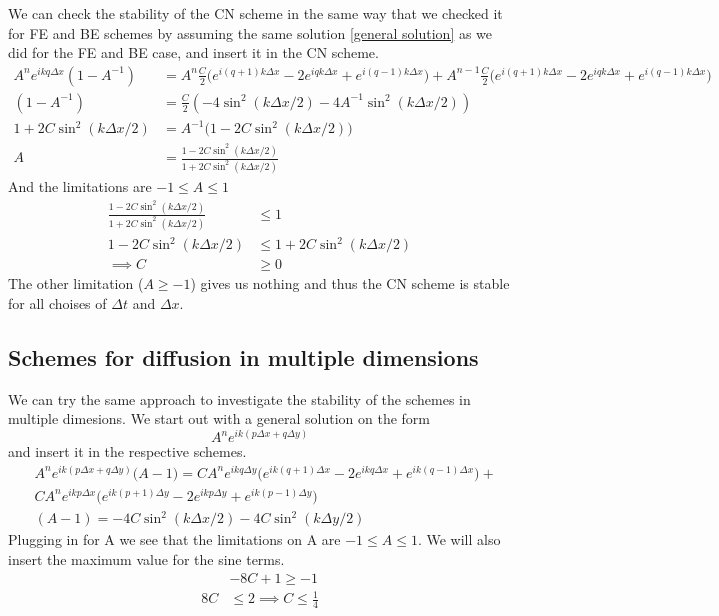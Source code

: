 \documentclass[a4paper,english, 10pt, twoside]{article}
\begin{document}
We can check the stability of the CN scheme in the same way that we checked it for FE and BE schemes by assuming the same solution 
\ref{general solution} as we did for the FE and BE case, and insert it in the CN scheme.
\begin{align*}
 A^ne^{ikq\Delta x}(1-A^{-1}) &= A^n\frac{C}{2}\big(e^{i(q+1)k\Delta x} -2e^{iqk\Delta x} +e^{i(q-1)k\Delta x}\big) + 
 A^{n-1}\frac{C}{2}\big(e^{i(q+1)k\Delta x} -2e^{iqk\Delta x} +e^{i(q-1)k\Delta x}\big) \\
 (1-A^{-1}) &= \frac{C}{2}\left(-4\sin^2(k\Delta x/2) -4A^{-1}\sin^2(k\Delta x/2)\right) \\
 1+2C\sin^2(k\Delta x/2) &= A^{-1}\big(1-2C\sin^2(k\Delta x/2)\big) \\
 A &= \frac{1-2C\sin^2(k\Delta x/2)}{1+2C\sin^2(k\Delta x/2)}
\end{align*}
And the limitations are $-1\leq A \leq 1$
\begin{align*}
\frac{1-2C\sin^2(k\Delta x/2)}{1+2C\sin^2(k\Delta x/2)} &\leq 1 \\
1-2C\sin^2(k\Delta x/2) &\leq 1+2C\sin^2(k\Delta x/2)\\
\implies C &\geq 0
\end{align*}
The other limitation ($A\geq -1$) gives us nothing and thus the CN scheme is stable for all choises of $\Delta t$ and $\Delta x$.

\subsection{Schemes for diffusion in multiple dimensions}

We can try the same approach to investigate the stability of the schemes in multiple dimesions. We start out with a general 
solution on the form
\begin{equation*}
 A^ne^{ik(p\Delta x +q\Delta y)}
\end{equation*}
and insert it in the respective schemes.
\begin{align*}
 &A^ne^{ik(p\Delta x +q\Delta y)}\big(A-1\big) = CA^ne^{ikq\Delta y}\big(e^{ik(q+1)\Delta x} -2e^{ikq\Delta x}+e^{ik(q-1)\Delta x}\big)+\\
 &CA^ne^{ikp\Delta x}\big(e^{ik(p+1)\Delta y} -2e^{ikp\Delta y} +e^{ik(p-1)\Delta y}\big) \\
 &(A-1) = -4C\sin^2(k\Delta x/2) -4C\sin^2(k\Delta y/2)
\end{align*}
Plugging in for A we see that the limitations on A are $-1 \leq A \leq 1$. We will also insert the maximum value for the sine terms.
\begin{align*}
 &-8C +1 \geq -1 \\
 8C &\leq 2
 \implies C \leq \frac{1}{4}
\end{align*}
\end{document}
